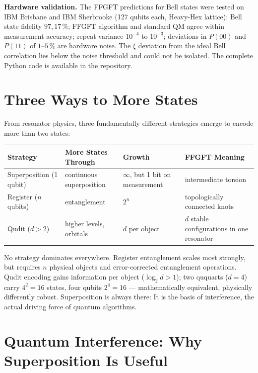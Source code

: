 \textbf{Hardware validation.} The FFGFT predictions for Bell states
were tested on IBM Brisbane and IBM Sherbrooke (127 qubits each, Heavy-Hex
lattice): Bell state fidelity $97{,}17\,\%$; FFGFT algorithm
and standard QM agree within measurement accuracy;
repeat variance $10^{-4}$ to $10^{-3}$; deviations in $P(00)$ and
$P(11)$ of $1$--$5\,\%$ are hardware noise. The
$\xi$ deviation from the ideal Bell correlation lies below the
noise threshold and could not be isolated. The complete
Python code is available in the repository.

\section{Three Ways to More States}

From resonator physics, three fundamentally different
strategies emerge to encode more than two states:

\begin{center}
\small\renewcommand{\arraystretch}{1.3}
\begin{tabular}{p{1.6cm}p{2.3cm}p{1.6cm}p{2.5cm}}
\toprule
\textbf{Strategy} & \textbf{More States Through} & \textbf{Growth} & \textbf{FFGFT Meaning} \\
\midrule
Superposition (1 qubit) & continuous superposition & $\infty$, but 1 bit on measurement & intermediate torsion \\
Register ($n$ qubits) & entanglement & $2^n$ & topologically connected knots \\
Qudit ($d>2$) & higher levels, orbitals & $d$ per object & $d$ stable configurations in one resonator \\
\bottomrule
\end{tabular}
\end{center}

No strategy dominates everywhere. Register entanglement scales most
strongly, but requires $n$ physical objects and error-corrected
entanglement operations. Qudit encoding gains information per object
($\log_2d>1$); two ququarts ($d = 4$) carry $4^2 = 16$ states, four
qubits $2^4 = 16$ --- mathematically equivalent, physically differently
robust. Superposition is always there: It is the basis of
interference, the actual driving force of quantum algorithms.

\section{Quantum Interference: Why Superposition Is Useful}

